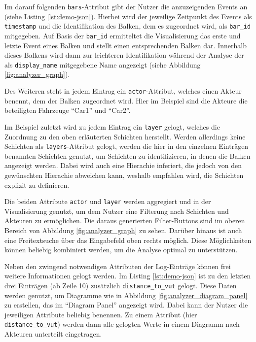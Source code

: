

Im darauf folgenden \texttt{bars}-Attribut gibt der Nutzer die anzuzeigenden Events an (siehe Listing \ref{lst:demo-json}). Hierbei wird der jeweilige Zeitpunkt des Events als \texttt{timestamp} und die Identifikation des Balken, dem es zugeordnet wird, als \texttt{bar\_id} mitgegeben. Auf Basis der \texttt{bar\_id} ermitteltet die Visualisierung das erste und letzte Event eines Balken und stellt einen entsprechenden Balken dar. Innerhalb dieses Balkens wird dann zur leichteren Identifikation während der Analyse der als \texttt{display\_name} mitgegebene Name angezeigt (siehe Abbildung \ref{fig:analyzer_graph}).

Des Weiteren steht in jedem Eintrag ein \texttt{actor}-Attribut, welches einen Akteur benennt, dem der Balken zugeordnet wird. Hier im Beispiel sind die Akteure die beteiligten Fahrzeuge \enquote{Car1} und \enquote{Car2}.

Im Beispiel zuletzt wird zu jedem Eintrag ein \texttt{layer} gelogt, welches die Zuordnung zu den oben erläuterten Schichten herstellt. Werden allerdings keine Schichten als \texttt{layers}-Attribut gelogt, werden die hier in den einzelnen Einträgen benannten Schichten genutzt, um Schichten zu identifizieren, in denen die Balken angezeigt werden. Dabei wird auch eine Hierachie inferiert, die jedoch von den gewünschten Hierachie abweichen kann, weshalb empfahlen wird, die Schichten explizit zu definieren.

Die beiden Attribute \texttt{actor} und \texttt{layer} werden aggregiert und in der Visualisierung genutzt, um dem Nutzer eine Filterung nach Schichten und Akteuren zu ermöglichen. Die daraus generierten Filter-Buttons sind im oberen Bereich von Abbildung \ref{fig:analyzer_graph} zu sehen.
Darüber hinaus ist auch eine Freitextsuche über das Eingabefeld oben rechts möglich. Diese Möglichkeiten können beliebig kombiniert werden, um die Analyse optimal zu unterstützen.

Neben den zwingend notwendigen Attributen der Log-Einträge können frei weitere Informationen gelogt werden. Im Listing \ref{lst:demo-json} ist zu den letzten drei Einträgen (ab Zeile 10) zusätzlich \texttt{distance\_to\_vut} gelogt. Diese Daten werden genutzt, um Diagramme wie in Abbildung \ref{fig:analyzer_diagram_panel} zu erstellen, das im \enquote{Diagram Panel} angezeigt wird. Dabei kann der Nutzer die jeweiligen Attribute beliebig benennen. Zu einem Attribut (hier \texttt{distance\_to\_vut}) werden dann alle gelogten Werte in einem Diagramm nach Akteuren unterteilt eingetragen.

